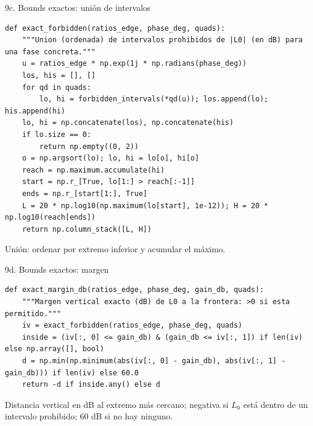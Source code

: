 \documentclass[aspectratio=169,11pt]{beamer}
\begin{document}
\begin{frame}[fragile]{9c. Bounds exactos: unión de intervalos}
\scriptsize
\begin{verbatim}
def exact_forbidden(ratios_edge, phase_deg, quads):
    """Union (ordenada) de intervalos prohibidos de |L0| (en dB) para una fase concreta."""
    u = ratios_edge * np.exp(1j * np.radians(phase_deg))
    los, his = [], []
    for qd in quads:
        lo, hi = forbidden_intervals(*qd(u)); los.append(lo); his.append(hi)
    lo, hi = np.concatenate(los), np.concatenate(his)
    if lo.size == 0:
        return np.empty((0, 2))
    o = np.argsort(lo); lo, hi = lo[o], hi[o]
    reach = np.maximum.accumulate(hi)
    start = np.r_[True, lo[1:] > reach[:-1]]
    ends = np.r_[start[1:], True]
    L = 20 * np.log10(np.maximum(lo[start], 1e-12)); H = 20 * np.log10(reach[ends])
    return np.column_stack([L, H])
\end{verbatim}
\footnotesize Unión: ordenar por extremo inferior y acumular el máximo.
\end{frame}

\begin{frame}[fragile]{9d. Bounds exactos: margen}
\scriptsize
\begin{verbatim}
def exact_margin_db(ratios_edge, phase_deg, gain_db, quads):
    """Margen vertical exacto (dB) de L0 a la frontera: >0 si esta permitido."""
    iv = exact_forbidden(ratios_edge, phase_deg, quads)
    inside = (iv[:, 0] <= gain_db) & (gain_db <= iv[:, 1]) if len(iv) else np.array([], bool)
    d = np.min(np.minimum(abs(iv[:, 0] - gain_db), abs(iv[:, 1] - gain_db))) if len(iv) else 60.0
    return -d if inside.any() else d
\end{verbatim}
\footnotesize Distancia vertical en dB al extremo más cercano; negativa si $L_0$ está dentro de un intervalo prohibido; $60$ dB si no hay ninguno.
\end{frame}
\end{document}
